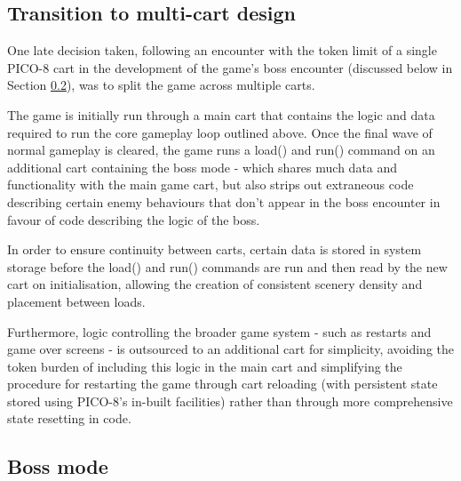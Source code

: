 \documentclass[11pt]{article}
\begin{document}
\subsection{Transition to multi-cart design}\label{multicart}

One late decision taken, following an encounter with the token limit of a single PICO-8 cart
in the development of the game's boss encounter (discussed below in Section \ref{boss}), was to
split the game across multiple carts.

The game is initially run through a main cart that contains the logic and data required to
run the core gameplay loop outlined above. Once the final wave of normal gameplay is cleared,
the game runs a load() and run() command on an additional cart containing the boss mode - which
shares much data and functionality with the main game cart, but also strips out extraneous
code describing certain enemy behaviours that don't appear in the boss encounter in favour of
code describing the logic of the boss.

In order to ensure continuity between carts, certain data is stored in system storage before
the load() and run() commands are run and then read by the new cart on initialisation, allowing
the creation of consistent scenery density and placement between loads.

Furthermore, logic controlling the broader game system - such as restarts and game over screens -
is outsourced to an additional cart for simplicity, avoiding the token burden of including this
logic in the main cart and simplifying the procedure for restarting the game through cart reloading
(with persistent state stored using PICO-8's in-built facilities) rather than through more
comprehensive state resetting in code.

\subsection{Boss mode}\label{boss}
\end{document}
